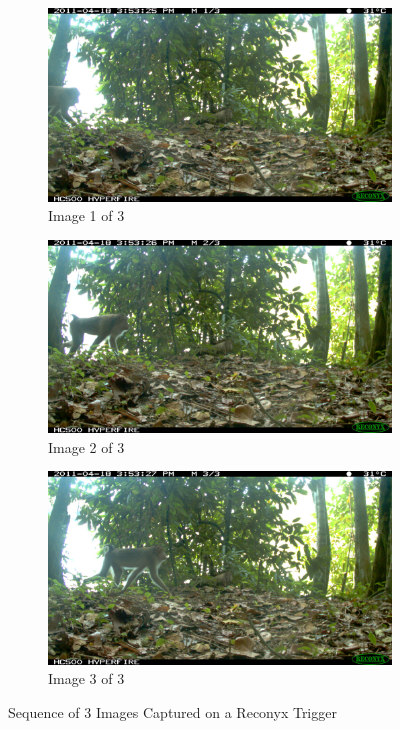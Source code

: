 \begin{figure}[ht!]
\centering
\begin{subfigure}[b]{0.5\textwidth}
  \centering
  \includegraphics[width=\textwidth]{Chap3/figures/IMG_0568}
  \caption{Image 1 of 3}
\end{subfigure}%
\begin{subfigure}[b]{0.5\textwidth}
  \centering
\includegraphics[width=\textwidth]{Chap3/figures/IMG_0569}
  \caption{Image 2 of 3}
\end{subfigure}
\begin{subfigure}[b]{0.5\textwidth}
  \centering
 \includegraphics[width=\textwidth]{Chap3/figures/IMG_0570}
  \caption{Image 3 of 3}
\end{subfigure}
\caption{Sequence of 3 Images Captured on a Reconyx Trigger}
\label{tech:reconyx}
\end{figure}

